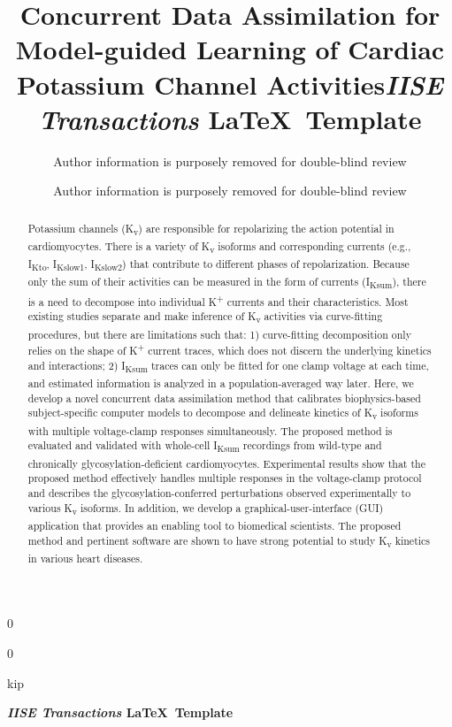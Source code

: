 \documentclass[11pt]{article}
\newcommand{\blind}{0}
\begin{document}
	
	\def\spacingset#1{\renewcommand{\baselinestretch}%
		{#1}\small\normalsize} \spacingset{1}
	
	\blind
	{
		\title{\bf Concurrent Data Assimilation for Model-guided Learning of Cardiac Potassium Channel Activities}
		\author{Author information is purposely removed for double-blind review}
		\date{}
		\maketitle
	} \fi
	
	\blind
	{
        \title{\bf \emph{IISE Transactions} \LaTeX \ Template}
		\author{Author information is purposely removed for double-blind review}
		
\bigskip
		\bigskip
		\bigs   kip
		\begin{center}
			{\LARGE\bf \emph{IISE Transactions} \LaTeX \ Template}
		\end{center}
		\medskip
	} \fi
	\bigskip

\begin{abstract}
Potassium channels (K\textsubscript{v}) are responsible for repolarizing the action potential in cardiomyocytes. There is a variety of K\textsubscript{v} isoforms and corresponding currents (e.g., I\textsubscript{Kto}, I\textsubscript{Kslow1}, I\textsubscript{Kslow2}) that contribute to different phases of repolarization. Because only the sum of their activities can be measured in the form of currents (I\textsubscript{Ksum}), there is a need to decompose into individual K\textsuperscript{+} currents and their characteristics. Most existing studies separate and make inference of K\textsubscript{v} activities via curve-fitting procedures, but there are limitations such that: 1) curve-fitting decomposition only relies on the shape of K\textsuperscript{+} current traces, which does not discern the underlying kinetics and interactions; 2) I\textsubscript{Ksum} traces can only be fitted for one clamp voltage at each time, and estimated information is analyzed in a population-averaged way later. Here, we develop a novel concurrent data assimilation method that calibrates biophysics-based subject-specific computer models to decompose and delineate kinetics of K\textsubscript{v} isoforms with multiple voltage-clamp responses simultaneously. The proposed method is evaluated and validated with whole-cell I\textsubscript{Ksum} recordings from wild-type and chronically glycosylation-deficient cardiomyocytes. Experimental results show that the proposed method effectively handles multiple responses in the voltage-clamp protocol and describes the glycosylation-conferred perturbations observed experimentally to various K\textsubscript{v} isoforms. In addition, we develop a graphical-user-interface (GUI) application that provides an enabling tool to biomedical scientists. The proposed method and pertinent software are shown to have strong potential to study K\textsubscript{v} kinetics in various heart diseases.
\end{abstract}
\end{document}
